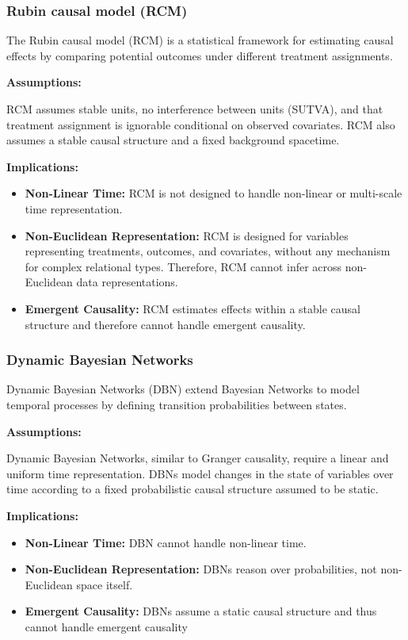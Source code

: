 \documentclass{article}
\begin{document}
\newpage

\subsubsection{Rubin causal model (RCM)}

The Rubin causal model\cite{rubin2005causal} (RCM) is a statistical framework for estimating causal effects by comparing potential outcomes under different treatment assignments.

\textbf{Assumptions:}

RCM assumes stable units, no interference between units (SUTVA), and that treatment assignment is ignorable conditional on observed covariates. RCM also assumes a stable causal structure and a fixed background spacetime.

\textbf{Implications:}

\begin{itemize}
    \item \textbf{Non-Linear Time:} RCM is not designed to handle non-linear or multi-scale time representation.
    \item \textbf{Non-Euclidean Representation:} RCM is designed for variables representing treatments, outcomes, and covariates, without any mechanism for complex relational types. Therefore, RCM cannot infer across non-Euclidean data representations.
    \item \textbf{Emergent Causality:} RCM estimates effects within a stable causal structure and therefore cannot handle emergent causality.
\end{itemize}

\subsubsection{Dynamic Bayesian Networks}

Dynamic Bayesian Networks\cite{dagum1992dynamic} (DBN) extend Bayesian Networks to model temporal processes by defining transition probabilities between states.

\textbf{Assumptions:}

Dynamic Bayesian Networks, similar to Granger causality, require a linear and uniform time representation. DBNs model changes in the state of variables over time according to a fixed probabilistic causal structure assumed to be static.


\textbf{Implications:}

\begin{itemize}
    \item \textbf{Non-Linear Time:} DBN cannot handle non-linear time.
    \item \textbf{Non-Euclidean Representation:} DBNs reason over probabilities, not non-Euclidean space itself.
    \item \textbf{Emergent Causality:}  DBNs assume a static causal structure and thus cannot handle emergent causality
\end{itemize}
\end{document}
